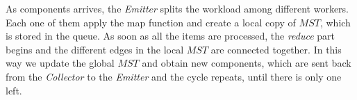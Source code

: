 \documentclass[notitlepage]{article}
\begin{document}
As components arrives, the {\itshape Emitter} splits the workload among different workers. Each one of them apply the map function and create a local copy of $MST$, which is stored in the queue. As soon as 
all the items are processed, the {\itshape reduce} part begins and the different edges in the local $MST$ are connected together. In this way we update the global $MST$ and obtain new components, 
which are sent back from the {\itshape Collector} to the {\itshape Emitter} and the cycle repeats, until there is only one left.
\end{document}
